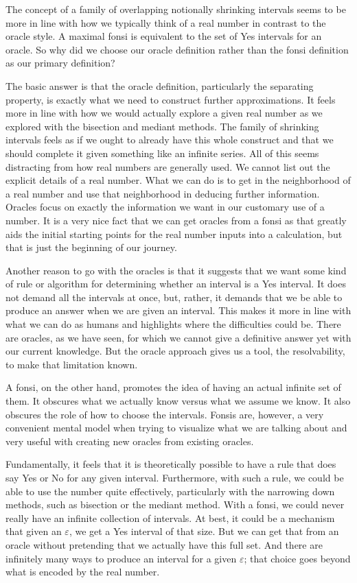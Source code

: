 \documentclass[12pt]{article}
\begin{document}
The concept of a family of overlapping notionally shrinking intervals seems to be more in line with how we typically think of a real number in contrast to the oracle style. A maximal fonsi is equivalent to the set of Yes intervals for an oracle.  So why did we choose our oracle definition rather than the fonsi definition as our primary definition? 

The basic answer is that the oracle definition, particularly the separating property, is exactly what we need to construct further approximations. It feels more in line with how we would actually explore a given real number as we explored with the bisection and mediant methods. The family of shrinking intervals feels as if we ought to already have this whole construct and that we should complete it given something like an infinite series. All of this seems distracting from how real numbers are generally used. We cannot list out the explicit details of a real number. What we can do is to get in the neighborhood of a real number and use that neighborhood in deducing further information. Oracles focus on exactly the information we want in our customary use of a number. It is a very nice fact that we can get oracles from a fonsi as that greatly aids the initial starting points for the real number inputs into a calculation, but that is just the beginning of our journey. 

Another reason to go with the oracles is that it suggests that we want some kind of rule or algorithm for determining whether an interval is a Yes interval. It does not demand all the intervals at once, but, rather, it demands that we be able to produce an answer when we are given an interval. This makes it more in line with what we can do as humans and highlights where the difficulties could be. There are oracles, as we have seen, for which we cannot give a definitive answer yet with our current knowledge. But the oracle approach gives us a tool, the resolvability, to make that limitation known. 

A fonsi, on the other hand, promotes the idea of having an actual infinite set of them.  It obscures what we actually know versus what we assume we know. It also obscures the role of how to choose the intervals. Fonsis are, however, a very convenient mental model when trying to visualize what we are talking about and very useful with creating new oracles from existing oracles. 

Fundamentally, it feels that it is theoretically possible to have a rule that does say Yes or No for any given interval. Furthermore, with such a rule, we could be able to use the number quite effectively, particularly with the narrowing down methods, such as bisection or the mediant method. With a fonsi, we could never really have an infinite collection of intervals. At best, it could be a mechanism that given an $\varepsilon$, we get a Yes interval of that size. But we can get that from an oracle without pretending that we actually have this full set. And there are infinitely many ways to produce an interval for a given $\varepsilon$; that choice goes beyond what is encoded by the real number. 
\end{document}
